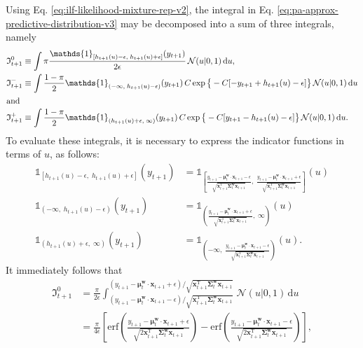 Using Eq. \eqref{eq:ilf-likelihood-mixture-rep-v2}, the integral in Eq. \eqref{eq:pa-approx-predictive-distribution-v3} may be decomposed into a sum of three integrals, namely
\begin{align}
	\mathfrak{I}_{t+1}^0
	&\equiv \int \pi\frac{\mathds{1}_{[h_{t+1}(u)-\epsilon,\; h_{t+1}(u)+\epsilon]}(y_{t+1})}{2\epsilon}\,
	\mathcal{N}(u|0, 1)\,\mathrm{d}u,
	\\
	\mathfrak{I}_{t+1}^-
	&\equiv \int\frac{1-\pi}{2}\mathds{1}_{(-\infty,\; h_{t+1}(u)-\epsilon)}(y_{t+1})\,C\exp\big\{-C[-y_{t+1} + h_{t+1}(u) -\epsilon]\big\}\,
	\mathcal{N}(u|0, 1)\,\mathrm{d}u
	\\
\intertext{and}
	\mathfrak{I}_{t+1}^+
	&\equiv \int\frac{1-\pi}{2}\mathds{1}_{(h_{t+1}(u)+\epsilon,\; \infty)}(y_{t+1})\,C\exp\big\{-C[y_{t+1} - h_{t+1}(u) -\epsilon]\big\}\,
	\mathcal{N}(u|0, 1)\,\mathrm{d}u.
\end{align}
To evaluate these integrals, it is necessary to express the indicator functions in terms of $u$, as follows:
\begin{align}
	\mathds{1}_{[h_{t+1}(u)-\epsilon,\; h_{t+1}(u)+\epsilon]}(y_{t+1})
	&= \mathds{1}_{\left[\frac{y_{t+1}-\boldsymbol{\mu}_{t}^\mathbf{w}\cdot\mathbf{x}_{t+1}-\epsilon}{\sqrt{\mathbf{x}_{t+1}^\text{T}\boldsymbol{\Sigma}_{t}^\mathbf{w}\mathbf{x}_{t+1}}},\; \frac{y_{t+1}-\boldsymbol{\mu}_{t}^\mathbf{w}\cdot\mathbf{x}_{t+1}+\epsilon}{\sqrt{\mathbf{x}_{t+1}^\text{T}\boldsymbol{\Sigma}_{t}^\mathbf{w}\mathbf{x}_{t+1}}}\right]}(u)
	\\
	\mathds{1}_{(-\infty,\; h_{t+1}(u)-\epsilon)}(y_{t+1})
	&= \mathds{1}_{\left(\frac{y_{t+1}-\boldsymbol{\mu}_{t}^\mathbf{w}\cdot\mathbf{x}_{t+1}+\epsilon}{\sqrt{\mathbf{x}_{t+1}^\text{T}\boldsymbol{\Sigma}_{t}^\mathbf{w}\mathbf{x}_{t+1}}},\; \infty\right)}(u)
	\\
	\mathds{1}_{(h_{t+1}(u)+\epsilon,\; \infty)}(y_{t+1})
	&= \mathds{1}_{\left(-\infty,\; \frac{y_{t+1}-\boldsymbol{\mu}_{t}^\mathbf{w}\cdot\mathbf{x}_{t+1}-\epsilon}{\sqrt{\mathbf{x}_{t+1}^\text{T}\boldsymbol{\Sigma}_{t}^\mathbf{w}\mathbf{x}_{t+1}}}\right)}(u).
\end{align}
It immediately follows that
\begin{equation}
\begin{split}
	\mathfrak{I}_{t+1}^0
	&= \frac{\pi}{2\epsilon} \int_{(y_{t+1}-\boldsymbol{\mu}_{t}^\mathbf{w}\cdot\mathbf{x}_{t+1}-\epsilon)/\sqrt{\mathbf{x}_{t+1}^\text{T}\boldsymbol{\Sigma}_{t}^\mathbf{w}\mathbf{x}_{t+1}}}^{(y_{t+1}-\boldsymbol{\mu}_{t}^\mathbf{w}\cdot\mathbf{x}_{t+1}+\epsilon)/\sqrt{\mathbf{x}_{t+1}^\text{T}\boldsymbol{\Sigma}_{t}^\mathbf{w}\mathbf{x}_{t+1}}}
	\,\mathcal{N}(u|0, 1)\,\mathrm{d}u
	\\
	&= \frac{\pi}{4\epsilon}\left[\mathrm{erf}\left(\frac{y_{t+1}-\boldsymbol{\mu}_{t}^\mathbf{w}\cdot\mathbf{x}_{t+1}+\epsilon}{\sqrt{2\mathbf{x}_{t+1}^\text{T}\boldsymbol{\Sigma}_{t}^\mathbf{w}\mathbf{x}_{t+1}}}\right) - \mathrm{erf}\left(\frac{y_{t+1}-\boldsymbol{\mu}_{t}^\mathbf{w}\cdot\mathbf{x}_{t+1}-\epsilon}{\sqrt{2\mathbf{x}_{t+1}^\text{T}\boldsymbol{\Sigma}_{t}^\mathbf{w}\mathbf{x}_{t+1}}}\right)\right],
\end{split}
\end{equation}
